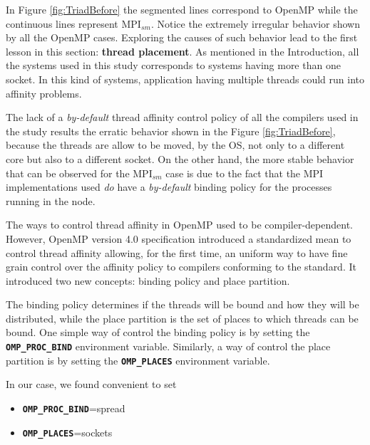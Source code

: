 In Figure \ref{fig:TriadBefore} the segmented lines correspond to OpenMP while the continuous lines represent MPI$_{sm}$. Notice the extremely irregular behavior shown by all the OpenMP cases. Exploring the causes of such behavior lead to the first lesson in this section: \textbf{thread placement}. As mentioned in the Introduction, all the systems used in this study corresponds to systems having more than one socket. In this kind of systems, application having multiple threads could run into affinity problems.

\medskip

The lack of a \emph{by-default} thread affinity control policy of all the compilers used in the study results the erratic behavior shown in the Figure \ref{fig:TriadBefore}, because the threads are allow to be moved, by the OS, not only to a different core but also to a different socket. On the other hand, the more stable behavior that can be observed for the MPI$_{sm}$ case is due to the fact that the MPI implementations used \emph{do} have a \emph{by-default} binding policy for the processes running in the node.

\medskip

The ways to control thread affinity in OpenMP used to be compiler-dependent. However, OpenMP version 4.0 specification introduced a standardized mean to control thread affinity allowing, for the first time, an uniform way to have fine grain control over the affinity policy to compilers conforming to the standard. It introduced two new concepts: binding policy and place partition.

The binding policy determines if the threads will be bound and how they will be distributed, while the place partition is the set of places to which threads can be bound. One simple way of control the binding policy is by setting the \textbf{\texttt{OMP\_PROC\_BIND}} environment variable. Similarly, a way of control the place partition is by setting the \textbf{\texttt{OMP\_PLACES}} environment variable. 

\medskip

In our case, we found convenient to set 

\begin{itemize} 

\item \textbf{\texttt{OMP\_PROC\_BIND}}=spread 

\item \textbf{\texttt{OMP\_PLACES}}=sockets

\end{itemize}

